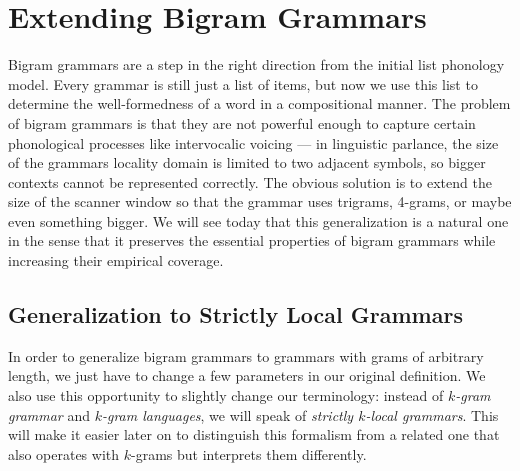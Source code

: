 \chapter{Extending Bigram Grammars}
\label{cha:SLMath}

Bigram grammars are a step in the right direction from the initial list phonology model.
Every grammar is still just a list of items, but now we use this list to determine the well-formedness of a word in a compositional manner.
The problem of bigram grammars is that they are not powerful enough to capture certain phonological processes like intervocalic voicing --- in linguistic parlance, the size of the grammars locality domain is limited to two adjacent symbols, so bigger contexts cannot be represented correctly.
The obvious solution is to extend the size of the scanner window so that the grammar uses trigrams, 4-grams, or maybe even something bigger.
We will see today that this generalization is a natural one in the sense that it preserves the essential properties of bigram grammars while increasing their empirical coverage.

\section{Generalization to Strictly Local Grammars}

In order to generalize bigram grammars to grammars with grams of arbitrary length, we just have to change a few parameters in our original definition.
We also use this opportunity to slightly change our terminology: instead of \emph{$k$-gram grammar} and \emph{$k$-gram languages}, we will speak of \emph{strictly $k$-local grammars}.
This will make it easier later on to distinguish this formalism from a related one that also operates with $k$-grams but interprets them differently.

